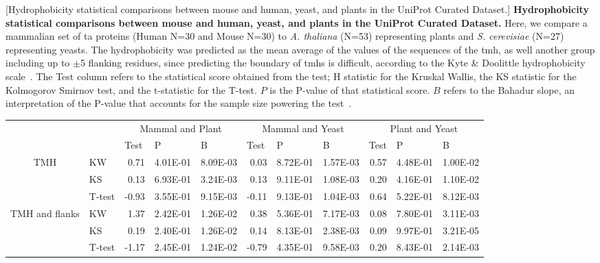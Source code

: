 \begin{table}[htbp]
\centering
{}[Hydrophobicity statistical comparisons between mouse and human, yeast, and plants in the UniProt Curated Dataset.]
{\textbf{Hydrophobicity statistical comparisons between mouse and human, yeast, and plants in the UniProt Curated Dataset.}
Here, we compare a mammalian set of \gls{ta} proteins (Human N=30 and Mouse N=30) to \textit{A. thaliana} (N=53) representing plants  and  \textit{S. cerevisiae} (N=27) representing yeasts.
The hydrophobicity was predicted as the mean average of the values of the sequences of the \gls{tmh}, as well another group including up to $\pm$5 flanking residues, since predicting the boundary of \gls{tmh}s is difficult, according to the Kyte \& Doolittle hydrophobicity scale~\cite{Kyte1982}.
The Test column refers to the statistical score obtained from the test; H statistic for the Kruskal Wallis, the KS statistic for the Kolmogorov Smirnov test, and the t-statistic for the T-test.
$P$ is the P-value of that statistical score.
$B$ refers to the Bahadur slope, an interpretation of the P-value that accounts for the sample size powering the test~\cite{Bahadur1967, Bahadur1971}.}
    \tiny

    \begin{tabular}{clrrrrrrrrr}
                &       & \multicolumn{3}{c}{Mammal and Plant} & \multicolumn{3}{c}{Mammal and Yeast} & \multicolumn{3}{c}{Plant and Yeast} \\
                &       & \multicolumn{1}{l}{Test} & \multicolumn{1}{l}{P} & \multicolumn{1}{l}{B} & \multicolumn{1}{l}{Test} & \multicolumn{1}{l}{P} & \multicolumn{1}{l}{B} & \multicolumn{1}{l}{Test} & \multicolumn{1}{l}{P} & \multicolumn{1}{l}{B} \\
    \multirow{3}[0]{*}{TMH} &  KW & 0.71  & 4.01E-01 & 8.09E-03 & 0.03  & 8.72E-01 & 1.57E-03 & 0.57  & 4.48E-01 & 1.00E-02 \\
                &  KS & 0.13  & 6.93E-01 & 3.24E-03 & 0.13  & 9.11E-01 & 1.08E-03 & 0.20  & 4.16E-01 & 1.10E-02 \\
                &  T-test & -0.93 & 3.55E-01 & 9.15E-03 & -0.11 & 9.13E-01 & 1.04E-03 & 0.64  & 5.22E-01 & 8.12E-03 \\
    \multirow{3}[0]{*}{TMH and flanks} &  KW & 1.37  & 2.42E-01 & 1.26E-02 & 0.38  & 5.36E-01 & 7.17E-03 & 0.08  & 7.80E-01 & 3.11E-03 \\
                &  KS & 0.19  & 2.40E-01 & 1.26E-02 & 0.14  & 8.13E-01 & 2.38E-03 & 0.09  & 9.97E-01 & 3.21E-05 \\
                &  T-test & -1.17 & 2.45E-01 & 1.24E-02 & -0.79 & 4.35E-01 & 9.58E-03 & 0.20  & 8.43E-01 & 2.14E-03 \\
    \end{tabular}%
                    \label{table:speciestableuniprotstats}
    \end{table}%

